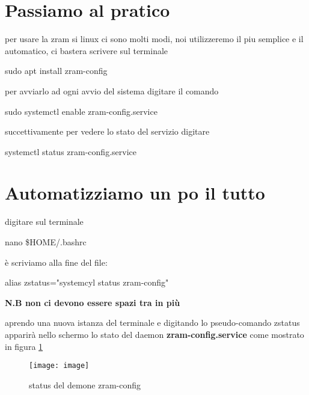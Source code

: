 \documentclass{article}
\begin{document}
		\section{Passiamo al pratico} per usare la zram si linux ci sono molti modi, noi utilizzeremo il piu semplice e il
		automatico, ci bastera scrivere sul terminale
		\begin{tcolorbox}
                sudo apt install zram-config
		\end{tcolorbox}
            per avviarlo ad ogni avvio del sistema digitare il comando 
            \begin{tcolorbox}
               sudo systemctl enable zram-config.service 
		\end{tcolorbox}
            succettivamente per vedere lo stato del servizio digitare
            \begin{tcolorbox}
               systemctl status zram-config.service 
		\end{tcolorbox}

            \section{Automatizziamo un po il tutto}
            digitare sul terminale 
            \begin{tcolorbox}
             nano \$HOME/.bashrc
            \end{tcolorbox}
            è scriviamo alla fine del file:
            \begin{tcolorbox}
            alias zstatus="systemcyl status zram-config"
            \end{tcolorbox}

            \textbf{N.B non ci devono essere spazi tra in più}
            
            aprendo una nuova istanza del terminale e digitando lo pseudo-comando zstatus 
            apparirà nello schermo lo stato del daemon \textbf{zram-config.service} come mostrato in figura \ref{f1}
            
            \begin{figure}
                \centering
                \texttt{[image: image]}
                \caption{status del demone zram-config}
                \label{f1}
            \end{figure}       
            
\end{document}
